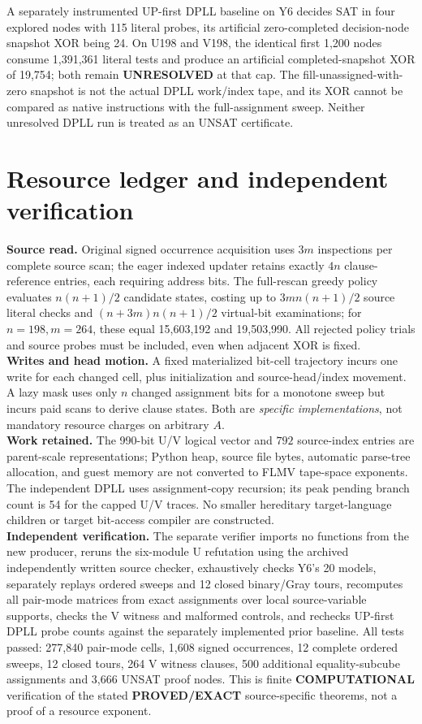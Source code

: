 \documentclass[11pt]{article}
\begin{document}
A separately instrumented UP-first DPLL baseline on Y6 decides SAT in four explored nodes with 115 literal probes, its artificial zero-completed decision-node snapshot XOR being 24. On U198 and V198, the identical first 1,200 nodes consume 1,391,361 literal tests and produce an artificial completed-snapshot XOR of 19,754; both remain \textbf{UNRESOLVED} at that cap. The fill-unassigned-with-zero snapshot is not the actual DPLL work/index tape, and its XOR cannot be compared as native instructions with the full-assignment sweep. Neither unresolved DPLL run is treated as an UNSAT certificate.

\section{Resource ledger and independent verification}
\noindent\textbf{Source read.} Original signed occurrence acquisition uses $3m$ inspections per complete source scan; the eager indexed updater retains exactly $4n$ clause-reference entries, each requiring address bits. The full-rescan greedy policy evaluates $n(n+1)/2$ candidate states, costing up to $3mn(n+1)/2$ source literal checks and $(n+3m)n(n+1)/2$ virtual-bit examinations; for $n=198,m=264$, these equal 15,603,192 and 19,503,990. All rejected policy trials and source probes must be included, even when adjacent XOR is fixed.\\
\noindent\textbf{Writes and head motion.} A fixed materialized bit-cell trajectory incurs one write for each changed cell, plus initialization and source-head/index movement. A lazy mask uses only $n$ changed assignment bits for a monotone sweep but incurs paid scans to derive clause states. Both are \emph{specific implementations}, not mandatory resource charges on arbitrary $A$.\\
\noindent\textbf{Work retained.} The 990-bit U/V logical vector and $792$ source-index entries are parent-scale representations; Python heap, source file bytes, automatic parse-tree allocation, and guest memory are not converted to FLMV tape-space exponents. The independent DPLL uses assignment-copy recursion; its peak pending branch count is 54 for the capped U/V traces. No smaller hereditary target-language children or target bit-access compiler are constructed.\\
\noindent\textbf{Independent verification.} The separate verifier imports no functions from the new producer, reruns the six-module U refutation using the archived independently written source checker, exhaustively checks Y6's 20 models, separately replays ordered sweeps and 12 closed binary/Gray tours, recomputes all pair-mode matrices from exact assignments over local source-variable supports, checks the V witness and malformed controls, and rechecks UP-first DPLL probe counts against the separately implemented prior baseline. All tests passed: 277,840 pair-mode cells, 1,608 signed occurrences, 12 complete ordered sweeps, 12 closed tours, 264 V witness clauses, 500 additional equality-subcube assignments and 3,666 UNSAT proof nodes. This is finite \textbf{COMPUTATIONAL} verification of the stated \textbf{PROVED/EXACT} source-specific theorems, not a proof of a resource exponent.
\end{document}
